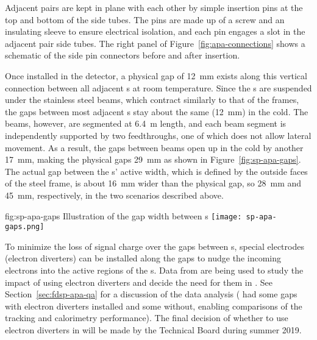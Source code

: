 Adjacent  pairs %
are kept in plane with each other by simple insertion pins at the top and bottom of the side tubes.  The pins are made up of a screw and an insulating sleeve to ensure electrical isolation, and each pin engages a slot in the adjacent  pair %
side tubes. The right panel of Figure~\ref{fig:apa-connections} shows a schematic of the side pin connectors before and after insertion.  

Once installed in the detector, a physical gap of \SI{12}{mm} exists along this vertical connection between all adjacent s at room temperature. Since the s are suspended under the stainless steel  beams, which contract similarly to that of the  frames, the gaps between most adjacent s stay about the same (\SI{12}{mm}) in the cold.  The  beams, however, are segmented at \SI{6.4}{m} length, and each beam segment is independently supported by two  feedthroughs, one of which does not allow lateral movement.  As a result, the gaps between  beams open up in the cold by another \SI{17}{mm},  %
making the physical gaps \SI{29}{mm} as shown in Figure~\ref{fig:sp-apa-gaps}.  The actual gap between the s' active width, which is defined by the outside faces of the steel frame, is about \SI{16}{mm} wider than the physical gap, so \SI{28}{mm} and \SI{45}{mm}, respectively, in the two scenarios described above.

\begin{dunefigure}{fig:sp-apa-gaps}
{Illustration of the gap width between s}  
\texttt{[image: sp-apa-gaps.png]} 
\end{dunefigure}


To minimize the loss of signal charge over the gaps between s, special electrodes (electron diverters) can be installed along the gaps to nudge the incoming electrons into the active regions of the s. Data from  are being used to study the impact of using electron diverters and decide the need for them in .  See Section~\ref{sec:fdsp-apa-qa} for a discussion of the  data analysis ( had some gaps with electron diverters installed and some without, enabling comparisons of the tracking and calorimetry performance).    The final decision of whether to use electron diverters in  will be made by the Technical Board during summer 2019.    

